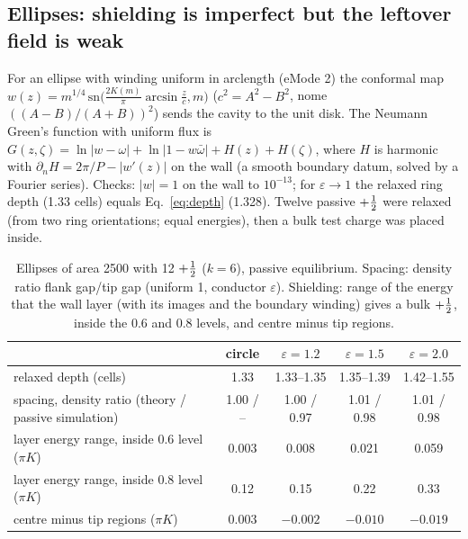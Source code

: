 \subsection{Ellipses: shielding is imperfect but the leftover field is weak}
For an ellipse with winding uniform in arclength (eMode 2) the conformal map $w(z)=m^{1/4}\,\mathrm{sn}\!\big(\tfrac{2K(m)}{\pi}\arcsin\tfrac zc,m\big)$
($c^2=A^2-B^2$, nome $((A-B)/(A+B))^2$) sends the cavity to the unit disk. The Neumann Green's function with uniform flux is
$G(z,\zeta)=\ln|w-\omega|+\ln|1-w\bar\omega|+H(z)+H(\zeta)$, where $H$ is harmonic with $\partial_nH=2\pi/P-|w'(z)|$ on the wall (a smooth
boundary datum, solved by a Fourier series). Checks: $|w|=1$ on the wall to $10^{-13}$; for $\varepsilon\to1$ the relaxed ring depth (1.33 cells)
equals Eq.~\eqref{eq:depth} (1.328). Twelve passive $+\tfrac12$ were relaxed (from two ring orientations; equal energies), then a bulk test charge
was placed inside.
\begin{table}[H]\centering\small
\caption{Ellipses of area 2500 with 12 $+\tfrac12$ ($k=6$), passive equilibrium. Spacing: density ratio flank gap/tip gap (uniform 1, conductor
$\varepsilon$). Shielding: range of the energy that the wall layer (with its images and the boundary winding) gives a bulk $+\tfrac12$, inside the
0.6 and 0.8 levels, and centre minus tip regions.}\label{tab:ellth}
\begin{tabular}{lcccc}\toprule
& circle & $\varepsilon=1.2$ & $\varepsilon=1.5$ & $\varepsilon=2.0$\\\midrule
relaxed depth (cells) & 1.33 & 1.33--1.35 & 1.35--1.39 & 1.42--1.55\\
spacing, density ratio (theory / passive simulation) & 1.00 / -- & 1.00 / 0.97 & 1.01 / 0.98 & 1.01 / 0.98\\
layer energy range, inside 0.6 level ($\pi K$) & 0.003 & 0.008 & 0.021 & 0.059\\
layer energy range, inside 0.8 level ($\pi K$) & 0.12 & 0.15 & 0.22 & 0.33\\
centre minus tip regions ($\pi K$) & 0.003 & $-0.002$ & $-0.010$ & $-0.019$\\\bottomrule
\end{tabular}
\end{table}
